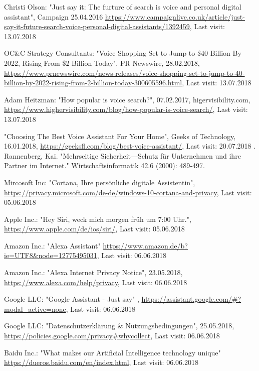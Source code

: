 \documentclass[journal]{IEEEtran}
\begin{document}
\begin{thebibliography}{1}
Christi Olson: "Just say it: The furture of search is voice and personal digital assistant", Campaign 25.04.2016 \url{https://www.campaignlive.co.uk/article/just-say-it-future-search-voice-personal-digital-assistants/1392459},
Last visit: 13.07.2018

OC\&C Strategy Consultants: "Voice Shopping Set to Jump to \$40 Billion By 2022, Rising From \$2 Billion Today", PR Newswire, 28.02.2018, \url{https://www.prnewswire.com/news-releases/voice-shopping-set-to-jump-to-40-billion-by-2022-rising-from-2-billion-today-300605596.html}, 
Last visit: 13.07.2018

Adam Heitzman: "How popular is voice search?", 07.02.2017, higervisibility.com, \url{https://www.highervisibility.com/blog/how-popular-is-voice-search/},
Last visit: 13.07.2018

"Choosing The Best Voice Assistant For Your Home", Geeks of Technology, 16.01.2018, \url{https://geeksfl.com/blog/best-voice-assistant/}, Last visit: 20.07.2018
.
Rannenberg, Kai. "Mehrseitige Sicherheit—Schutz für Unternehmen und ihre Partner im Internet." Wirtschaftsinformatik 42.6 (2000): 489-497.

Mircosoft Inc: "Cortana, Ihre persönliche digitale Assistentin", \url{https://privacy.microsoft.com/de-de/windows-10-cortana-and-privacy},
Last visit: 05.06.2018

Apple Inc.: "Hey Siri, weck mich morgen früh um 7:00 Uhr.",
\url{https://www.apple.com/de/ios/siri/},
Last visit: 05.06.2018

Amazon Inc.: "Alexa Assistant"
\url{https://www.amazon.de/b?ie=UTF8&node=12775495031},
Last visit: 06.06.2018

Amazon Inc.: "Alexa Internet Privacy Notice", 23.05.2018,
\url{https://www.alexa.com/help/privacy},
Last visit: 06.06.2018

Google LLC: "Google Assistant - Just say" ,
\url{https://assistant.google.com/#?modal_active=none},
Last visit: 06.06.2018

Google LLC: "Datenschutzerklärung \& Nutzungsbedingungen", 25.05.2018, \url{https://policies.google.com/privacy#whycollect},
Last visit: 06.06.2018

Baidu Inc.: "What makes our Artificial Intelligence technology unique"  \url{https://dueros.baidu.com/en/index.html},
Last visit: 06.06.2018


\end{thebibliography}
\end{document}
